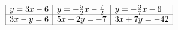 \begin{solution}
$$\begin{array}{|l|l|l|}
y=3x-6                                                                                                       & y=-\frac{5}{2}x-\frac{7}{2}                                                                                           & y=-\frac{3}{7}x-6                                                                                                    \\ \hline
3x-y=6                                                                                                    & 5x+2y=-7                                                                                                                  & 3x+7y=-42                                                                                                             \\ \hline
\end{array}
$$
\end{solution}

